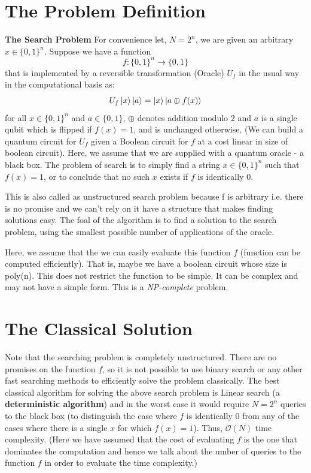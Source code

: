 \section{The Problem Definition}
\begin{definition}
    \textbf{The Search Problem} For convenience let, $N = 2^n$, we are given an arbitrary $x \in \{0, 1\}^n$.
    Suppose we have a function
    \[
        f:\{0,1\}^n \rightarrow \{0,1\}
    \]
    that is implemented by a reversible transformation (Oracle) $U_f$ in the usual way in the computational basis as:
    \[
        U_f\ket{x}\ket{a}=\ket{x}\ket{a\oplus f(x)}
    \]
    for all $x \in \{0,1\}^n$ and $a \in \{0,1\}$, $\oplus$ denotes addition modulo $2$ and $a$ is a single qubit which is flipped if $f(x)=1$, and is unchanged otherwise. (We can build a quantum circuit for $U_f$ given a Boolean circuit for $f$ at a cost linear in size of boolean circuit). Here, we assume that we are supplied with a quantum oracle - a black box. The problem of search is to simply find a string 
    $ x \in \{0,1\}^n$ such that $f(x)=1$, or to conclude that no such $x$ exists if $f$ is identically 0. 

    This is also called as unstructured search problem because f is arbitrary i.e. there is no promise and we can't rely on it have a structure that makes finding solutions easy. The foal of the algorithm is to find a solution to the search problem, using the smallest possible number of applications of the oracle.
    \begin{remark}Here, we assume that the we can easily evaluate this function $f$ (function can be computed efficiently). That is, maybe we have a boolean circuit whose size is poly(n). This does not restrict the function to be simple. It can be complex and may not have a simple form. This is a \textit{NP-complete} problem. 
    \end{remark}
\end{definition}

\section{The Classical Solution}
Note that the searching problem is completely unstructured. There are no promises on the function $f$, so it is not possible to use binary search or any other fast searching methods to efficiently solve the problem classically. The best classical algorithm for solving the above search problem is Linear search (a \textbf{deterministic algorithm}) and in the worst case it would require $N=2^n$ queries to the black box (to distinguish the case where $f$ is identically 0 from any of the cases where there is a single $x$ for which $f(x)=1$). Thus, $\mathcal{O}(N)$ time complexity. (Here we have assumed that the cost of evaluating $f$ is the one that dominates the computation and hence we talk about the umber of queries to the function $f$ in order to evaluate the time complexity.)

